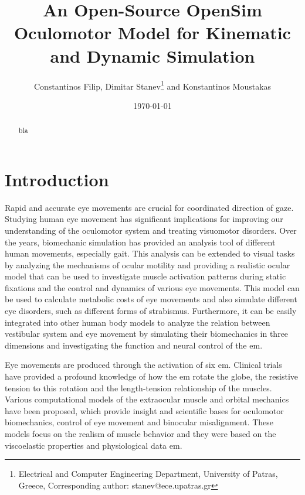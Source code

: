 \documentclass[11pt,a4paper,draft=false]{report}
\title{An Open-Source OpenSim Oculomotor Model for Kinematic and Dynamic
  Simulation}
\author{Constantinos Filip, Dimitar Stanev\footnote{Electrical and Computer
    Engineering Department, University of Patras, Greece, Corresponding author:
    stanev@ece.upatras.gr} and Konstantinos Moustakas}
\date{\today}
\begin{document}

\maketitle

\begin{abstract}
  bla
\end{abstract}

\section*{Introduction}\label{sec:introduction}

Rapid and accurate eye movements are crucial for coordinated direction of
gaze. Studying human eye movement has significant implications for improving our
understanding of the oculomotor system and treating visuomotor disorders. Over
the years, biomechanic simulation has provided an analysis tool of different
human movements, especially gait. This analysis can be extended to visual tasks
by analyzing the mechanisms of ocular motility and providing a realistic ocular
model that can be used to investigate muscle activation patterns during static
fixations and the control and dynamics of various eye movements. This model can
be used to calculate metabolic costs of eye movements and also simulate
different eye disorders, such as different forms of strabismus. Furthermore, it
can be easily integrated into other human body models to analyze the relation
between vestibular system and eye movement by simulating their biomechanics in
three dimensions and investigating the function and neural control of the
\gls{em}.

Eye movements are produced through the activation of six \gls{em}. Clinical
trials have provided a profound knowledge of how the \gls{em} rotate the globe,
the resistive tension to this rotation and the length-tension relationship of
the muscles. Various computational models of the extraocular muscle and orbital
mechanics have been proposed, which provide insight and scientific bases for
oculomotor biomechanics, control of eye movement and binocular
misalignment. These models focus on the realism of muscle behavior and they were
based on the viscoelastic properties and physiological data \gls{em}.
\end{document}
